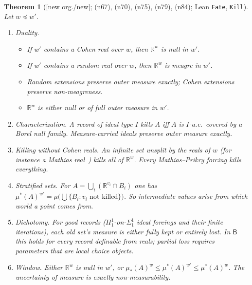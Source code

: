 \documentclass[11pt]{article}
\newtheorem{theorem}{Theorem}[section]
\theoremstyle{definition}
\theoremstyle{remark}
\newcommand{\B}{\mathsf{B}}
\newcommand{\R}{\mathbb{R}}
\newcommand{\lean}[1]{\texttt{#1}}
\newcommand{\status}[1]{\textsf{[#1]}}
\newcommand{\note}[1]{\textsf{(n#1)}}
\begin{document}
\begin{theorem}[\status{new org./new}; \note{67}, \note{70}, \note{75}, \note{79}, \note{84}; Lean \lean{Fate}, \lean{Kill}]\label{thm:fate}
Let $w\preccurlyeq w'$.
\begin{enumerate}
\item \emph{Duality.}
  \begin{itemize}
  \item If $w'$ contains a Cohen real over $w$, then $\R^w$ is null in $w'$.
  \item If $w'$ contains a random real over $w$, then $\R^w$ is meagre in $w'$.
  \item Random extensions preserve outer measure exactly; Cohen extensions preserve non-meagreness.
  \item $\R^w$ is either null or of full outer measure in $w'$.
  \end{itemize}
\item \emph{Characterization.} A record of ideal type $I$ kills $A$ iff $A$ is $I$-a.e.\ covered by a Borel null family. Measure-carried ideals preserve outer measure exactly.
\item \emph{Killing without Cohen reals.} An infinite set unsplit by the reals of $w$ (for instance a Mathias real~\cite{Mathias77}) kills all of $\R^w$. Every Mathias--Prikry forcing kills everything.
\item \emph{Stratified sets.} For $A=\bigcup_i(\R^{v_i}\cap B_i)$ one has $\mu^*(A)^{w'}=\mu\big(\bigcup\{B_i:v_i\text{ not killed}\}\big)$. So intermediate values arise from which world a point comes from.
\item \emph{Dichotomy.} For good records ($\Pi^1_1$-on-$\Sigma^1_1$ ideal forcings and their finite iterations), each old set's measure is either fully kept or entirely lost. In $\B$ this holds for every record definable from reals; partial loss requires parameters that are local choice objects.
\item \emph{Window.} Either $\R^w$ is null in $w'$, or $\mu_*(A)^w\le\mu^*(A)^{w'}\le\mu^*(A)^w$. The uncertainty of measure is exactly non-measurability.
\end{enumerate}
\end{theorem}
\end{document}
